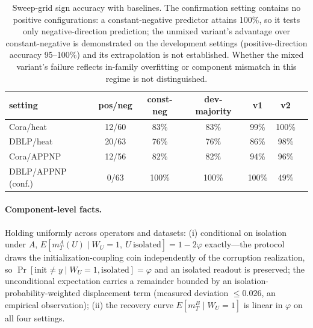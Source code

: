 \begin{table}[h]
\centering\small
\begin{tabular}{lcccccc}
\hline
setting & pos/neg & const-neg & dev-majority & v1 & v2 \\
\hline
Cora/heat      & 12/60 & 83\% & 83\% & 99\%  & 100\% \\
DBLP/heat      & 20/63 & 76\% & 76\% & 86\%  & 98\%  \\
Cora/APPNP     & 12/56 & 82\% & 82\% & 94\%  & 96\%  \\
DBLP/APPNP (conf.) & 0/63 & 100\% & 100\% & 100\% & 49\% \\
\hline
\end{tabular}
\caption{Sweep-grid sign accuracy with baselines. The
confirmation setting contains no positive configurations: a
constant-negative predictor attains 100\%, so it tests only
negative-direction prediction; the unmixed variant's advantage
over constant-negative is demonstrated on the development
settings (positive-direction accuracy 95--100\%) and its
extrapolation is not established. Whether the mixed variant's
failure reflects in-family overfitting or component mismatch in
this regime is not distinguished.}
\label{tab:app-rules}
\end{table}

\paragraph{Component-level facts.}
Holding uniformly across operators and datasets: (i) conditional
on isolation under $A$,
$E[m^A_T(U)\mid W_U{=}1,\ U\ \text{isolated}]=1-2\varphi$
exactly---the protocol draws the initialization-coupling coin
independently of the corruption realization, so
$\Pr[\text{init}\ne y\mid W_U{=}1,\text{isolated}]=\varphi$ and
an isolated readout is preserved; the unconditional expectation
carries a remainder bounded by an isolation-probability-weighted
displacement term (measured deviation $\le0.026$, an empirical
observation); (ii) the recovery curve $E[m^B_T\mid W_U{=}1]$ is
linear in $\varphi$ on all four settings.

